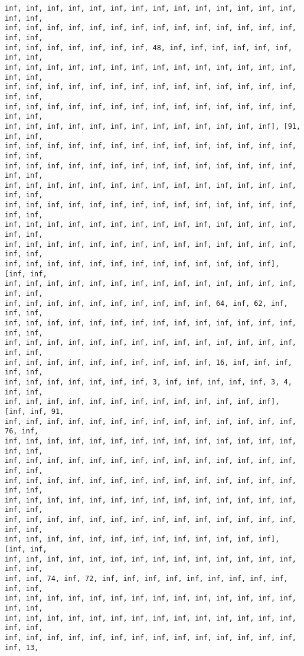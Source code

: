 \documentclass[11pt]{article}
\begin{document}
\begin{Verbatim}[commandchars=\\\{\}]
inf, inf, inf, inf, inf, inf, inf, inf, inf, inf, inf, inf, inf, inf, inf, inf,
inf, inf, inf, inf, inf, inf, inf, inf, inf, inf, inf, inf, inf, inf, inf, inf,
inf, inf, inf, inf, inf, inf, inf, 48, inf, inf, inf, inf, inf, inf, inf, inf,
inf, inf, inf, inf, inf, inf, inf, inf, inf, inf, inf, inf, inf, inf, inf, inf,
inf, inf, inf, inf, inf, inf, inf, inf, inf, inf, inf, inf, inf, inf, inf, inf,
inf, inf, inf, inf, inf, inf, inf, inf, inf, inf, inf, inf, inf, inf, inf, inf,
inf, inf, inf, inf, inf, inf, inf, inf, inf, inf, inf, inf, inf], [91, inf, inf,
inf, inf, inf, inf, inf, inf, inf, inf, inf, inf, inf, inf, inf, inf, inf, inf,
inf, inf, inf, inf, inf, inf, inf, inf, inf, inf, inf, inf, inf, inf, inf, inf,
inf, inf, inf, inf, inf, inf, inf, inf, inf, inf, inf, inf, inf, inf, inf, inf,
inf, inf, inf, inf, inf, inf, inf, inf, inf, inf, inf, inf, inf, inf, inf, inf,
inf, inf, inf, inf, inf, inf, inf, inf, inf, inf, inf, inf, inf, inf, inf, inf,
inf, inf, inf, inf, inf, inf, inf, inf, inf, inf, inf, inf, inf, inf, inf, inf,
inf, inf, inf, inf, inf, inf, inf, inf, inf, inf, inf, inf, inf], [inf, inf,
inf, inf, inf, inf, inf, inf, inf, inf, inf, inf, inf, inf, inf, inf, inf, inf,
inf, inf, inf, inf, inf, inf, inf, inf, inf, inf, 64, inf, 62, inf, inf, inf,
inf, inf, inf, inf, inf, inf, inf, inf, inf, inf, inf, inf, inf, inf, inf, inf,
inf, inf, inf, inf, inf, inf, inf, inf, inf, inf, inf, inf, inf, inf, inf, inf,
inf, inf, inf, inf, inf, inf, inf, inf, inf, inf, 16, inf, inf, inf, inf, inf,
inf, inf, inf, inf, inf, inf, inf, 3, inf, inf, inf, inf, inf, 3, 4, inf, inf,
inf, inf, inf, inf, inf, inf, inf, inf, inf, inf, inf, inf, inf], [inf, inf, 91,
inf, inf, inf, inf, inf, inf, inf, inf, inf, inf, inf, inf, inf, inf, 76, inf,
inf, inf, inf, inf, inf, inf, inf, inf, inf, inf, inf, inf, inf, inf, inf, inf,
inf, inf, inf, inf, inf, inf, inf, inf, inf, inf, inf, inf, inf, inf, inf, inf,
inf, inf, inf, inf, inf, inf, inf, inf, inf, inf, inf, inf, inf, inf, inf, inf,
inf, inf, inf, inf, inf, inf, inf, inf, inf, inf, inf, inf, inf, inf, inf, inf,
inf, inf, inf, inf, inf, inf, inf, inf, inf, inf, inf, inf, inf, inf, inf, inf,
inf, inf, inf, inf, inf, inf, inf, inf, inf, inf, inf, inf, inf], [inf, inf,
inf, inf, inf, inf, inf, inf, inf, inf, inf, inf, inf, inf, inf, inf, inf, inf,
inf, inf, 74, inf, 72, inf, inf, inf, inf, inf, inf, inf, inf, inf, inf, inf,
inf, inf, inf, inf, inf, inf, inf, inf, inf, inf, inf, inf, inf, inf, inf, inf,
inf, inf, inf, inf, inf, inf, inf, inf, inf, inf, inf, inf, inf, inf, inf, inf,
inf, inf, inf, inf, inf, inf, inf, inf, inf, inf, inf, inf, inf, inf, inf, 13,

\end{Verbatim}
\end{document}
